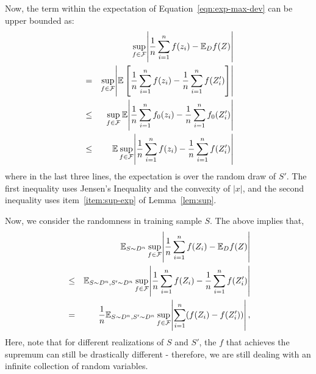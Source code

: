\documentclass{article}
\newcommand{\EE}{\mathbb{E}}
\newcommand{\Fcal}{\mathcal{F}}
\begin{document}
Now, the term within the expectation of Equation~\eqref{eqn:exp-max-dev} can be upper bounded as:
\begin{eqnarray*}
  && \sup_{f \in \Fcal} \abs{\frac{1}{n} \sum_{i=1}^n f(z_i) - \EE_D f(Z)} \\
  &=& \sup_{f \in \Fcal} \abs{\EE \sbr{\frac{1}{n} \sum_{i=1}^n f(z_i) - \frac{1}{n} \sum_{i=1}^n f(Z_i')}} \\
  &\leq& \sup_{f \in \Fcal} \EE \abs{\frac{1}{n} \sum_{i=1}^n f_0(z_i) - \frac{1}{n} \sum_{i=1}^n f_0(Z_i')} \\
  &\leq& \EE \sup_{f \in \Fcal} \abs{\frac{1}{n} \sum_{i=1}^n f(z_i) - \frac{1}{n} \sum_{i=1}^n f(Z_i')}
\end{eqnarray*}
where in the last three lines, the expectation is over the random draw of $S'$. The first inequality uses Jensen's Inequality and the convexity of $|x|$, and the second inequality uses item~\ref{item:sup-exp} of Lemma~\ref{lem:sup}.

Now, we consider the randomness in training sample $S$. The above implies that,
\begin{eqnarray}
  && \EE_{S \sim D^n} \sup_{f \in \Fcal} \abs{\frac{1}{n} \sum_{i=1}^n f(Z_i) - \EE_D f(Z)} \nonumber \\
  &\leq& \EE_{S \sim D^n, S' \sim D^n} \sup_{f \in \Fcal} \abs{\frac{1}{n} \sum_{i=1}^n f(Z_i) - \frac{1}{n} \sum_{i=1}^n f(Z_i')} \nonumber \\
  &=& \frac{1}{n} \EE_{S \sim D^n, S' \sim D^n} \sup_{f \in \Fcal} \abs{\sum_{i=1}^n (f(Z_i) - f(Z_i'))} \label{eqn:to-be-sym},
\end{eqnarray}
Here, note that for different realizations of $S$ and $S'$, the $f$ that achieves the supremum can still be drastically different - therefore, we are still dealing with an infinite collection of random variables.
\end{document}
